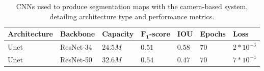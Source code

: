 \begin{table}[htbp]
\caption{CNNs used to produce segmentation maps with the camera-based system, detailing architecture type and performance metrics.}
\centering
\begin{tabular}{lllllll}
\toprule
\textbf{Architecture} & \textbf{Backbone}  & \textbf{Capacity} & \textbf{$\mathbf{F_{1}}$\hyp{}score}   & \textbf{IOU}  & \textbf{Epochs} & \textbf{Loss} \\
\midrule
Unet                  & ResNet-34          & $24.5M$           & $0.51$                                 & $0.58$         & $70$           & $2*10^{-3}$   \\
Unet                  & ResNet-50          & $32.6M$           & $0.54$                                 & $0.47$         & $70$           & $7*10^{-4}$   \\
\bottomrule
\end{tabular}
\label{table:cog-model}
\end{table}